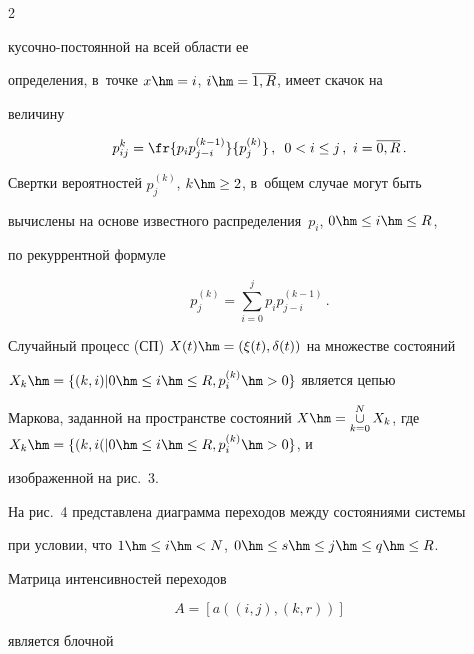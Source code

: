\begin{multicols}{2}
\noindent

 ку\-соч\-но-по\-сто\-ян\-ной на всей области ее 

определения, в~точке $x\hm=i$, $i\hm= \overline{1,R}$, имеет скачок на 

величину

  $$

  p_{ij}^k = \fr{p_i p_{j-i}^{(k-1)}}{p_j^{(k)}}\,,\enskip 0<i\leq j\,,\ 

i=\overline{0,R}\,.

  $$

  

  Свертки вероятностей $p_j^{(k)}$, $k\hm\geq 2$, в~общем случае могут быть 

вычислены на основе известного распределения~$p_i$, $0\hm\leq i\hm\leq R$, 

по рекуррентной формуле



\noindent

  \begin{equation}

  p_j^{(k)} = \sum\limits_{i=0}^j p_i p_{j-i}^{(k-1)}\,.

  \label{e1-v}

  \end{equation}

  

  Случайный процесс (СП) $X(t)\hm= (\xi(t),\delta(t))$ на множестве состояний 

$X_k\hm= \{ (k,i)\vert 0\hm\leq i\hm\leq R, p_i^{(k)}\hm>0\}$ является цепью 

Маркова, заданной на пространстве состояний $X\hm= \mathop{\cup}\limits_{k=0}^N 

X_k$, где $X_k\hm= \{ (k,i(\vert 0\hm\leq i \hm\leq R, p_i^{(k)}\hm>0\}$, и~

изображенной на рис.~3.

  

  На рис.~4 представлена диаграмма переходов между состояниями системы 

при условии, что $1\hm\leq i\hm< N$, $0\hm\leq s\hm\leq j\hm\leq q\hm\leq R$.

  

 

  

  Матрица интенсивностей переходов 

  $$

  A= [a((i,j),(k,r))]

  $$

   является блочной 


\end{multicols}

